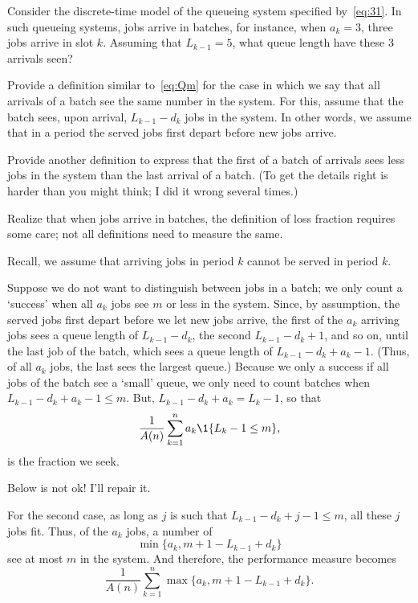 \documentclass[companion]{subfiles}
\begin{document}
\begin{exercise} Consider the discrete-time model of the queueing system specified by~\cref{eq:31}.
In such queueing systems, jobs arrive in batches, for instance, when $a_k=3$, three jobs arrive in slot $k$.
Assuming that $L_{k-1}=5$, what queue length have these 3 arrivals seen?  

Provide a definition similar to~\cref{eq:Qm} for the case in which we say that all arrivals of a batch see the same number in the system.
For this, assume that the batch sees, upon arrival,  $L_{k-1} - d_k$ jobs in the system.
In other words, we assume that in a period the served jobs first depart before new jobs arrive. 


Provide another definition to express that the first of a batch of arrivals sees less jobs in the system than the last arrival of a batch. 
(To get the details right is harder than you might think; I did it wrong several times.)
\begin{hint}
Realize that when jobs arrive in batches, the definition of loss fraction requires some care; not all definitions need to measure the same.

\end{hint}
\begin{solution} 
Recall, we assume that arriving jobs in period $k$ cannot be served in period $k$. 


Suppose we do not want to distinguish between jobs in a batch; we only count a `success' when all $a_k$ jobs see $m$ or less in the system.
Since, by assumption, the served jobs first depart before we let new jobs arrive, the first of the $a_k$ arriving jobs sees a queue length of $L_{k-1} - d_k$, the second $L_{k-1}-d_k + 1$, and so on, until the last job of the batch, which sees a queue length of $L_{k-1} - d_k + a_k -1$.
(Thus, of all $a_k$ jobs, the last sees the largest queue.)
Because we only a success if all jobs of the batch see a `small' queue, we only need to count batches when $L_{k-1}-d_k + a_k -1 \leq m$.
But, $L_{k-1}-d_k + a_k = L_k-1$, so that
\begin{equation*}
\frac 1{A(n)}\sum_{k=1}^n a_k \1{L_k-1 \leq m},
\end{equation*}
is the fraction we seek.


Below is not ok! I'll repair it.

For the second case, as long as $j$ is such that $L_{k-1}-d_k + j -1 \leq m$, all these $j$ jobs fit. Thus, of the $a_k$ jobs, a number of
\begin{equation*}
  \min\{a_k, m+1 - L_{k-1} + d_k\}
\end{equation*}
see at most $m$ in the system. And therefore, the performance measure becomes
\begin{equation*}
\frac 1{A(n)}\sum_{k=1}^n \max\{a_k, m+1-L_{k-1} + d_k\}.
\end{equation*}


\end{solution}
\end{exercise}
\end{document}
